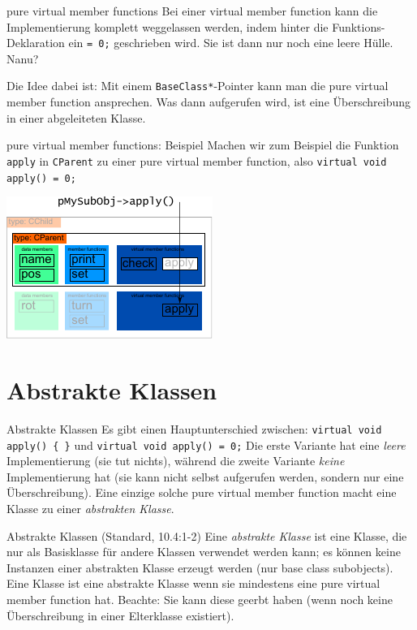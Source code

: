 \begin{frame}[fragile]{pure virtual member functions}
	Bei einer virtual member function kann die Implementierung komplett weggelassen werden, indem hinter die Funktions-Deklaration ein \verb|= 0;| geschrieben wird. Sie ist dann nur noch eine leere Hülle. Nanu?
	
	\pause
	\vspace{1em}
	
	Die Idee dabei ist: Mit einem \verb|BaseClass*|-Pointer kann man die pure virtual member function ansprechen. Was dann aufgerufen wird, ist eine Überschreibung in einer abgeleiteten Klasse.
\end{frame}

\begin{frame}[fragile,b]{pure virtual member functions: Beispiel}
	Machen wir zum Beispiel die Funktion \verb|apply| in \verb|CParent| zu einer pure virtual member function, also \verb|virtual void apply() = 0;|
	
	\vspace{1em}
	\includegraphics[width=0.5\linewidth]{images/pMySubObj-pureVirtApply}
\end{frame}


\section{Abstrakte Klassen}

\begin{frame}[fragile]{Abstrakte Klassen}
	Es gibt einen Hauptunterschied zwischen:
	\verb|virtual void apply() { }|
	und
	\verb|virtual void apply() = 0;|
	Die erste Variante hat eine \emph{leere} Implementierung (sie tut nichts), während die zweite Variante \emph{keine} Implementierung hat (sie kann nicht selbst aufgerufen werden, sondern nur eine Überschreibung).
	Eine einzige solche pure virtual member function macht eine Klasse zu einer \emph{abstrakten Klasse}.
	
	\pause
	
	\begin{block}{Abstrakte Klassen (Standard, 10.4:1-2)}
		Eine \emph{abstrakte Klasse} ist eine Klasse, die nur als Basisklasse für andere Klassen verwendet werden kann; es können keine Instanzen einer abstrakten Klasse erzeugt werden (nur base class subobjects). Eine Klasse ist eine abstrakte Klasse wenn sie mindestens eine pure virtual member function hat. Beachte: Sie kann diese geerbt haben (wenn noch keine Überschreibung in einer Elterklasse existiert).
	\end{block}
\end{frame}

